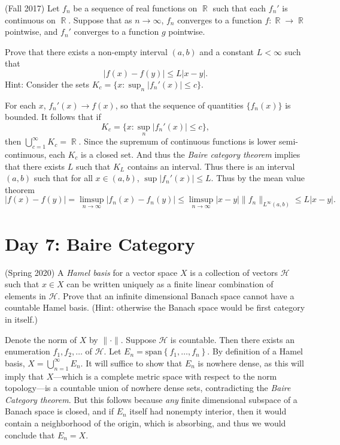 \documentclass[answers]{exam}
\DeclareMathOperator{\RR}{\mathbb{R}}
\begin{document}
\begin{questions}
\question (Fall 2017) Let $f_n$ be a sequence of real functions on $\RR$ such that each $f_n'$ is continuous on $\RR$. Suppose that as $n \to \infty$, $f_n$ converges to a function $f: \RR \to \RR$ pointwise, and $f_n'$ converges to a function $g$ pointwise.

Prove that there exists a non-empty interval $(a,b)$ and a constant $L < \infty$ such that
%
\[ |f(x) - f(y)| \leq L |x-y|. \]
%
Hint: Consider the sets $K_c = \{ x: \sup_n |f_n'(x)| \leq c \}$.
\begin{solution}
    For each $x$, $f_n'(x) \to f(x)$, so that the sequence of quantities $\{ f_n(x) \}$ is bounded. It follows that if
    \[ K_c = \{ x : \sup_n |f_n'(x)| \leq c \}, \]
    then $\bigcup_{c = 1}^\infty K_c = \RR$. Since the supremum of continuous functions is lower semi-continuous, each $K_c$ is a closed set. And thus the \emph{Baire category theorem} implies that there exists $L$ such that $K_L$ contains an interval. Thus there is an interval $(a,b)$ such that for all $x \in (a,b)$, $\sup |f_n'(x)| \leq L$. Thus by the mean value theorem
    \[ |f(x) - f(y)| = \limsup_{n \to \infty} |f_n(x) - f_n(y)| \leq \limsup_{n \to \infty} |x - y| \| f_n \|_{L^\infty(a,b)} \leq L |x - y|. \]
\end{solution}




\newpage
\section{Day 7: Baire Category}

\item (Spring 2020)
  A \emph{Hamel basis} for a vector space $X$ is a collection of vectors $\mathcal{H}$ such that $x \in X$ can be written uniquely as a finite linear combination of elements in $\mathcal{H}$. Prove that an infinite dimensional Banach space cannot have a countable Hamel basis. (Hint: otherwise the Banach space would be first category in itself.)

\begin{solution}
  Denote the norm of $X$ by $\| \cdot \|$. Suppose $\mathcal{H}$ is countable. Then there exists an enumeration $f_{1},f_{2},\ldots$ of $\mathcal{H}$. Let $E_{n}= \text{span}\left\{ f_{1},\ldots,f_{n} \right\}$. By definition of a Hamel basis, $X=\bigcup_{n=1}^{\infty} E_{n}$. It will suffice to show that $E_{n}$ is nowhere dense, as this will imply that $X$---which is a complete metric space with respect to the norm topology---is a countable union of nowhere dense sets, contradicting the \emph{Baire Category theorem}. But this follows because \emph{any} finite dimensional subspace of a Banach space is closed, and if $E_n$ itself had nonempty interior, then it would contain a neighborhood of the origin, which is absorbing, and thus we would conclude that $E_n = X$.
\end{solution}


\end{questions}
\end{document}
